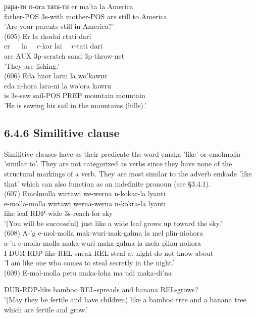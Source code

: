 \documentclass[10pt]{article}
\begin{document}
рара-ти п-оra тата-ти er ma'ta la America\\
father-POS 3s-with mother-POS are still to America\\
'Are your parents still in America?'\\
(605) Er la rkorlai rtati dari\\
er \(\quad\) la \(\quad r\)-kor lai \(\quad r\)-tati dari\\
are AUX 3p-scratch sand 3p-throw-net\\
'They are fishing.'\\
(606) Eda hnor larni la wo'kawur\\
eda n-hora lara-ni la wo'ora kawru\\
is 3s-sew sail-POS PREP mountain mountain\\
'He is sewing his sail in the mountains (hills).'

\subsection*{6.4.6 Similitive clause}
Similitive clauses have as their predicate the word emaka 'like' or emolmolla 'similar to'. They are not categorized as verbs since they have none of the structural markings of a verb. They are most similar to the adverb emkade 'like that' which can also function as an indefinite pronoun (see §3.4.1).\\
(607) Emolmolla wirtawi we-werna n-kokar-la lyanti\\
e-molla-molla wirtawi werna-werna n-kokra-la lyanti\\
like leaf RDP-wide 3s-reach-for sky\\
'(You will be successful) just like a wide leaf grows up toward the sky.'\\
(608) A-'g e-mol-molla mak-wuri-mak-galma la mel plin-niohora\\
a-'u e-molla-molla maka-wuri-maka-galma la mela plinu-nohora\\
I DUR-RDP-like REL-sneak-REL-steal at night do not know-about\\
'I am like one who comes to steal secretly in the night.'\\
(609) E-mol-molla petu maka-loha ma udi maka-di'na

DUR-RDP-like bamboo REL-spreads and banana REL-grows?\\
'(May they be fertile and have children) like a bamboo tree and a banana tree which are fertile and grow.'
\end{document}
